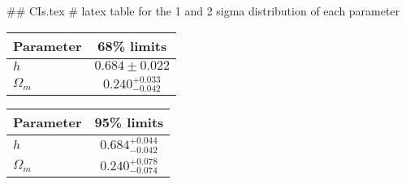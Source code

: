 ## CIs.tex
# latex table for the 1 and 2 sigma distribution of each parameter

\begin{tabular} { l  c}
 Parameter &  68\% limits\\
\hline
{\boldmath$h              $} & $0.684\pm 0.022            $\\
{\boldmath$\Omega_m       $} & $0.240^{+0.033}_{-0.042}   $\\
\hline
\end{tabular}

\begin{tabular} { l  c}
 Parameter &  95\% limits\\
\hline
{\boldmath$h              $} & $0.684^{+0.044}_{-0.042}   $\\
{\boldmath$\Omega_m       $} & $0.240^{+0.078}_{-0.074}   $\\
\hline
\end{tabular}
